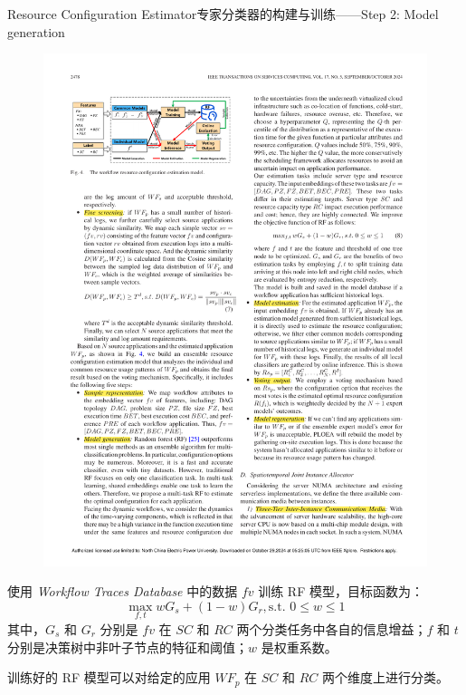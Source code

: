 \documentclass[aspectratio=169]{beamer}
\begin{document}
\begin{frame}{Resource Configuration Estimator}{专家分类器的构建与训练——Step 2: Model generation}
  \begin{figure}
    \centering
    \includegraphics[height=0.4\textheight]{img/method/resource-configuration-estimation-model.pdf}
  \end{figure}
  使用 \textit{Workflow Traces Database} 中的数据 $fv$ 训练 RF 模型，目标函数为：
  \begin{equation*}
    \max_{f,t} w G_s + (1-w) G_r, \text{s.t. } 0 \leqslant w \leqslant 1
  \end{equation*}
  其中，$G_s$ 和 $G_r$ 分别是 $fv$ 在 $SC$ 和 $RC$ 两个分类任务中各自的信息增益；$f$ 和 $t$ 分别是决策树中非叶子节点的特征和阈值；$w$ 是权重系数。

  训练好的 RF 模型可以对给定的应用 $WF_p$ 在 $SC$ 和 $RC$ 两个维度上进行分类。
\end{frame}
\end{document}
